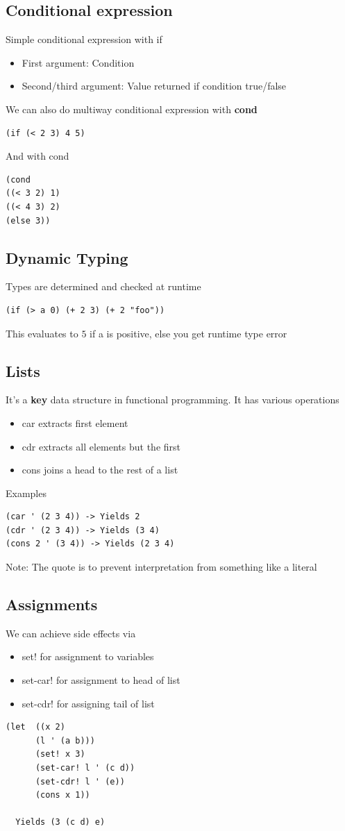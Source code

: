 \documentclass{article}
\begin{document}
\subsection{Conditional expression}
Simple conditional expression with if
\begin{itemize}
  \item First argument: Condition
  \item Second/third argument: Value returned if condition true/false
\end{itemize}
We can also do multiway conditional expression with \textbf{cond}
\begin{lstlisting}
(if (< 2 3) 4 5)
\end{lstlisting}
And with cond
\begin{lstlisting}
(cond
((< 3 2) 1)
((< 4 3) 2)
(else 3))
\end{lstlisting}

\subsection{Dynamic Typing}
Types are determined and checked at runtime


\begin{lstlisting}
(if (> a 0) (+ 2 3) (+ 2 "foo"))  
\end{lstlisting}
This evaluates to $5$ if a is positive, else you get runtime type error
\subsection{Lists}
It's a \textbf{key} data structure in functional programming. It has various operations
\begin{itemize}
  \item car extracts first element
  \item cdr extracts all elements but the first
  \item cons joins a head to the rest of a list
\end{itemize}
Examples
\begin{lstlisting}
(car ' (2 3 4)) -> Yields 2
(cdr ' (2 3 4)) -> Yields (3 4)
(cons 2 ' (3 4)) -> Yields (2 3 4)
\end{lstlisting}
Note: The quote is to prevent interpretation from something like a literal

\subsection{Assignments}
We can achieve side effects via
\begin{itemize}
  \item set! for assignment to variables
  \item set-car! for assignment to head of list
  \item set-cdr! for assigning tail of list
\end{itemize}
\begin{lstlisting}
(let  ((x 2)
      (l ' (a b)))
      (set! x 3)
      (set-car! l ' (c d))
      (set-cdr! l ' (e))
      (cons x 1))

  Yields (3 (c d) e)
\end{lstlisting}
\end{document}
